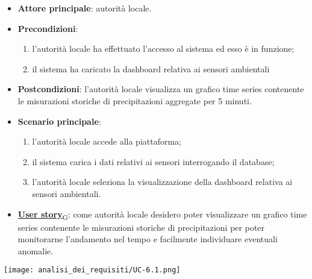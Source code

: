\begin{itemize}
	\item \textbf{Attore principale}: autorità locale.
	\item \textbf{Precondizioni}:
	      \begin{enumerate}
		      \item l'autorità locale ha effettuato l'accesso al sistema ed esso è in funzione;
		      \item il sistema ha caricato la dashboard relativa ai sensori ambientali
	      \end{enumerate}
	\item \textbf{Postcondizioni}: l'autorità locale visualizza un grafico time series contenente le misurazioni storiche
	      di precipitazioni aggregate per 5 minuti.
	\item \textbf{Scenario principale}:
	      \begin{enumerate}
		      \item l'autorità locale accede alla piattaforma;
		      \item il sistema carica i dati relativi ai sensori interrogando il database;
		      \item l'autorità locale seleziona la visualizzazione della dashboard relativa ai sensori ambientali.
	      \end{enumerate}
	\item \href{https://7last.github.io/docs/pb/documentazione-interna/glossario\#user-story}{\textbf{User story}\textsubscript{G}}:
	      come autorità locale desidero poter visualizzare un grafico time series contenente le misurazioni storiche
	      di precipitazioni per poter monitorarne l'andamento nel tempo e facilmente individuare eventuali anomalie.
\end{itemize}
\begin{center}
	\texttt{[image: analisi\_dei\_requisiti/UC-6.1.png]}
\end{center}


